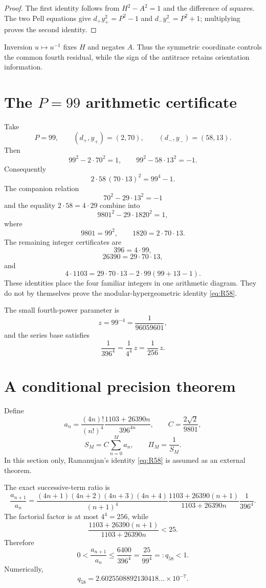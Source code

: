 \documentclass[11pt]{amsart}
\theoremstyle{definition}
\theoremstyle{remark}
\begin{document}
\begin{proof}
The first identity follows from $H^2-A^2=1$ and the difference of squares. The two Pell equations give $d_+y_+^2=P^2-1$ and $d_-y_-^2=P^2+1$; multiplying proves the second identity.
\end{proof}

Inversion $u\mapsto u^{-1}$ fixes $H$ and negates $A$. Thus the symmetric coordinate controls the common fourth residual, while the sign of the antitrace retains orientation information.

\section{The $P=99$ arithmetic certificate}\label{sec:n58}

Take
\[
 P=99,
 \qquad(d_+,y_+)=(2,70),
 \qquad(d_-,y_-)=(58,13).
\]
Then
\[
 99^2-2\cdot70^2=1,
 \qquad
 99^2-58\cdot13^2=-1.
\]
Consequently
\[
 2\cdot58\,(70\cdot13)^2=99^4-1.
\]
The companion relation
\[
 70^2-29\cdot13^2=-1
\]
and the equality $2\cdot58=4\cdot29$ combine into
\[
 \boxed{9801^2-29\cdot1820^2=1,}
\]
where
\[
 9801=99^2,\qquad 1820=2\cdot70\cdot13.
\]
The remaining integer certificates are
\[
 396=4\cdot99,
\]
\[
 26390=29\cdot70\cdot13,
\]
and
\[
 \boxed{4\cdot1103
 =29\cdot70\cdot13-2\cdot99(99+13-1).}
\]
These identities place the four familiar integers in one arithmetic diagram. They do not by themselves prove the modular-hypergeometric identity \eqref{eq:R58}.

The small fourth-power parameter is
\[
 z=99^{-4}=\frac1{96059601},
\]
and the series base satisfies
\[
 \frac1{396^4}=\frac1{4^4}\,z=\frac1{256}\,z.
\]

\section{A conditional precision theorem}\label{sec:precision}

Define
\[
 a_n=\frac{(4n)!}{(n!)^4}
 \frac{1103+26390n}{396^{4n}},
 \qquad
 C=\frac{2\sqrt2}{9801},
\]
\[
 S_M=C\sum_{n=0}^M a_n,
 \qquad
 \Pi_M=\frac1{S_M}.
\]
In this section only, Ramanujan's identity \eqref{eq:R58} is assumed as an external theorem.

The exact successive-term ratio is
\[
\frac{a_{n+1}}{a_n}
=
\frac{(4n+1)(4n+2)(4n+3)(4n+4)}{(n+1)^4}
\frac{1103+26390(n+1)}{1103+26390n}
\frac1{396^4}.
\]
The factorial factor is at most $4^4=256$, while
\[
 \frac{1103+26390(n+1)}{1103+26390n}<25.
\]
Therefore
\[
 0<\frac{a_{n+1}}{a_n}
 \le\frac{6400}{396^4}
 =\frac{25}{99^4}
 =:q_{58}<1.
\]
Numerically,
\[
 q_{58}=2.6025508892130418\ldots\times10^{-7}.
\]
\end{document}
